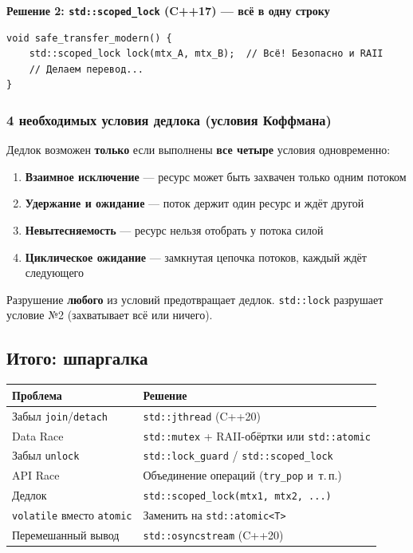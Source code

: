 \documentclass[a4paper,12pt]{article}
\begin{document}
\textbf{Решение 2: \texttt{std::scoped\_lock} (C++17) --- всё в одну строку}

\begin{lstlisting}
void safe_transfer_modern() {
    std::scoped_lock lock(mtx_A, mtx_B);  // Всё! Безопасно и RAII
    // Делаем перевод...
}
\end{lstlisting}

\subsubsection{4 необходимых условия дедлока (условия Коффмана)}

Дедлок возможен \textbf{только} если выполнены \textbf{все четыре} условия одновременно:

\begin{enumerate}
    \item \textbf{Взаимное исключение} --- ресурс может быть захвачен только одним потоком
    \item \textbf{Удержание и ожидание} --- поток держит один ресурс и ждёт другой
    \item \textbf{Невытесняемость} --- ресурс нельзя отобрать у потока силой
    \item \textbf{Циклическое ожидание} --- замкнутая цепочка потоков, каждый ждёт следующего
\end{enumerate}

Разрушение \textbf{любого} из условий предотвращает дедлок. \texttt{std::lock}
разрушает условие №2 (захватывает всё или ничего).

\subsection{Итого: шпаргалка}

\begin{center}
\begin{tabular}{lp{8cm}}
\toprule
\textbf{Проблема} & \textbf{Решение} \\
\midrule
Забыл \texttt{join}/\texttt{detach}
    & \texttt{std::jthread} (C++20) \\
\addlinespace
Data Race
    & \texttt{std::mutex} + RAII-обёртки или \texttt{std::atomic} \\
\addlinespace
Забыл \texttt{unlock}
    & \texttt{std::lock\_guard} / \texttt{std::scoped\_lock} \\
\addlinespace
API Race
    & Объединение операций (\texttt{try\_pop} и~т.\,п.) \\
\addlinespace
Дедлок
    & \texttt{std::scoped\_lock(mtx1, mtx2, ...)} \\
\addlinespace
\texttt{volatile} вместо \texttt{atomic}
    & Заменить на \texttt{std::atomic<T>} \\
\addlinespace
Перемешанный вывод
    & \texttt{std::osyncstream} (C++20) \\
\bottomrule
\end{tabular}
\end{center}
\end{document}
